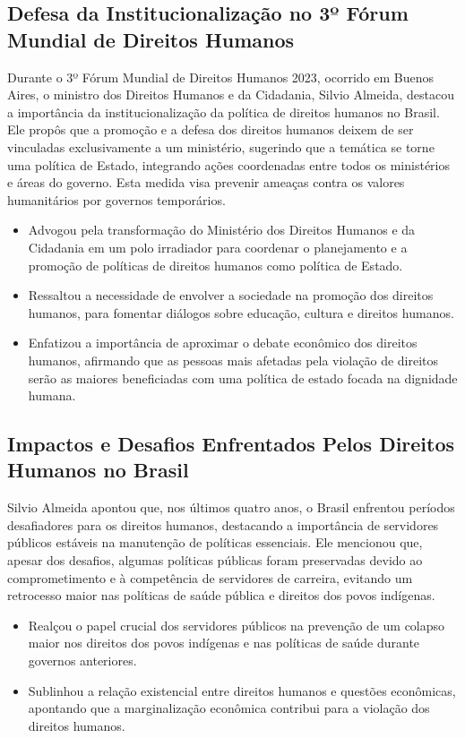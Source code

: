 \documentclass[
   article,       
   12pt,          
   oneside,       
   a4paper,       
   english,       
   brazil,        
   sumario=tradicional
   ]{abntex2}
\begin{document}
\subsection{Defesa da Institucionalização no 3º Fórum Mundial de Direitos Humanos}

Durante o 3º Fórum Mundial de Direitos Humanos 2023, ocorrido em Buenos Aires, o ministro dos Direitos Humanos e da Cidadania, Silvio Almeida, destacou a importância da institucionalização da política de direitos humanos no Brasil. Ele propôs que a promoção e a defesa dos direitos humanos deixem de ser vinculadas exclusivamente a um ministério, sugerindo que a temática se torne uma política de Estado, integrando ações coordenadas entre todos os ministérios e áreas do governo. Esta medida visa prevenir ameaças contra os valores humanitários por governos temporários.

\begin{itemize}
    \item Advogou pela transformação do Ministério dos Direitos Humanos e da Cidadania em um polo irradiador para coordenar o planejamento e a promoção de políticas de direitos humanos como política de Estado.
    \item Ressaltou a necessidade de envolver a sociedade na promoção dos direitos humanos, para fomentar diálogos sobre educação, cultura e direitos humanos.
    \item Enfatizou a importância de aproximar o debate econômico dos direitos humanos, afirmando que as pessoas mais afetadas pela violação de direitos serão as maiores beneficiadas com uma política de estado focada na dignidade humana.
\end{itemize}

\subsection{Impactos e Desafios Enfrentados Pelos Direitos Humanos no Brasil}

Silvio Almeida apontou que, nos últimos quatro anos, o Brasil enfrentou períodos desafiadores para os direitos humanos, destacando a importância de servidores públicos estáveis na manutenção de políticas essenciais. Ele mencionou que, apesar dos desafios, algumas políticas públicas foram preservadas devido ao comprometimento e à competência de servidores de carreira, evitando um retrocesso maior nas políticas de saúde pública e direitos dos povos indígenas.

\begin{itemize}
    \item Realçou o papel crucial dos servidores públicos na prevenção de um colapso maior nos direitos dos povos indígenas e nas políticas de saúde durante governos anteriores.
    \item Sublinhou a relação existencial entre direitos humanos e questões econômicas, apontando que a marginalização econômica contribui para a violação dos direitos humanos.
\end{itemize}
\end{document}
